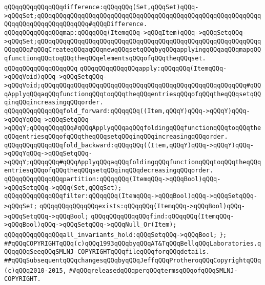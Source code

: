\newline
\verb|qQQqqQQqqQQqqQQqdifference:qQQqqQQq(Set,qQQqSet)qQQq->qQQqSet;qQQqqQQqqQQqqQQqqQQqqQQqqQQqqQQqqQQqqQQqqQQqqQQqqQQqqQQqqQQqqQQqqQQqqQQqqQQqqQQqqQQq#qQQqDifference.|\newline
\newline
\verb|qQQqqQQqqQQqqQQqmap:qQQqqQQq(ItemqQQq->qQQqItem)qQQq->qQQqSetqQQq->qQQqSet;qQQqqQQqqQQqqQQqqQQqqQQqqQQqqQQqqQQqqQQqqQQqqQQqqQQqqQQqqQQqqQQqqQQq#qQQqCreateqQQqaqQQqnewqQQqsetqQQqbyqQQqapplyingqQQqaqQQqmapqQQqfunctionqQQqtoqQQqtheqQQqelementsqQQqofqQQqtheqQQqset.|\newline
\verb|qQQqqQQqqQQqqQQqqQQq|\newline
\verb|qQQqqQQqqQQqqQQqapply:qQQqqQQq(ItemqQQq->qQQqVoid)qQQq->qQQqSetqQQq->qQQqVoid;qQQqqQQqqQQqqQQqqQQqqQQqqQQqqQQqqQQqqQQqqQQqqQQqqQQqqQQq#qQQqApplyqQQqaqQQqfunctionqQQqtoqQQqtheqQQqentriesqQQqofqQQqtheqQQqsetqQQqinqQQqincreasingqQQqorder.|\newline
\newline
\verb|qQQqqQQqqQQqqQQqfold_forward:qQQqqQQq((Item,qQQqY)qQQq->qQQqY)qQQq->qQQqYqQQq->qQQqSetqQQq->qQQqY;qQQqqQQqqQQq#qQQqApplyqQQqaqQQqfoldingqQQqfunctionqQQqtoqQQqtheqQQqentriesqQQqofqQQqtheqQQqsetqQQqinqQQqincreasingqQQqorder.|\newline
\newline
\verb|qQQqqQQqqQQqqQQqfold_backward:qQQqqQQq((Item,qQQqY)qQQq->qQQqY)qQQq->qQQqYqQQq->qQQqSetqQQq->qQQqY;qQQqqQQq#qQQqApplyqQQqaqQQqfoldingqQQqfunctionqQQqtoqQQqtheqQQqentriesqQQqofqQQqtheqQQqsetqQQqinqQQqdecreasingqQQqorder.|\newline
\newline
\verb|qQQqqQQqqQQqqQQqpartition:qQQqqQQq(ItemqQQq->qQQqBool)qQQq->qQQqSetqQQq->qQQq(Set,qQQqSet);|\newline
\newline
\verb|qQQqqQQqqQQqqQQqfilter:qQQqqQQq(ItemqQQq->qQQqBool)qQQq->qQQqSetqQQq->qQQqSet;|\newline
\newline
\verb|qQQqqQQqqQQqqQQqexists:qQQqqQQq(ItemqQQq->qQQqBool)qQQq->qQQqSetqQQq->qQQqBool;|\newline
\newline
\verb|qQQqqQQqqQQqqQQqfind:qQQqqQQq(ItemqQQq->qQQqBool)qQQq->qQQqSetqQQq->qQQqNull_Or(Item);|\newline
\newline
\verb|qQQqqQQqqQQqqQQqall_invariants_hold:qQQqSetqQQq->qQQqBool;|\newline
\verb|};|\newline
\newline
\newline
\verb|##qQQqCOPYRIGHTqQQq(c)qQQq1993qQQqbyqQQqAT&TqQQqBellqQQqLaboratories.qQQqqQQqSeeqQQqSMLNJ-COPYRIGHTqQQqfileqQQqforqQQqdetails.|\newline
\verb|##qQQqSubsequentqQQqchangesqQQqbyqQQqJeffqQQqProtheroqQQqCopyrightqQQq(c)qQQq2010-2015,|\newline
\verb|##qQQqreleasedqQQqperqQQqtermsqQQqofqQQqSMLNJ-COPYRIGHT.|\newline

